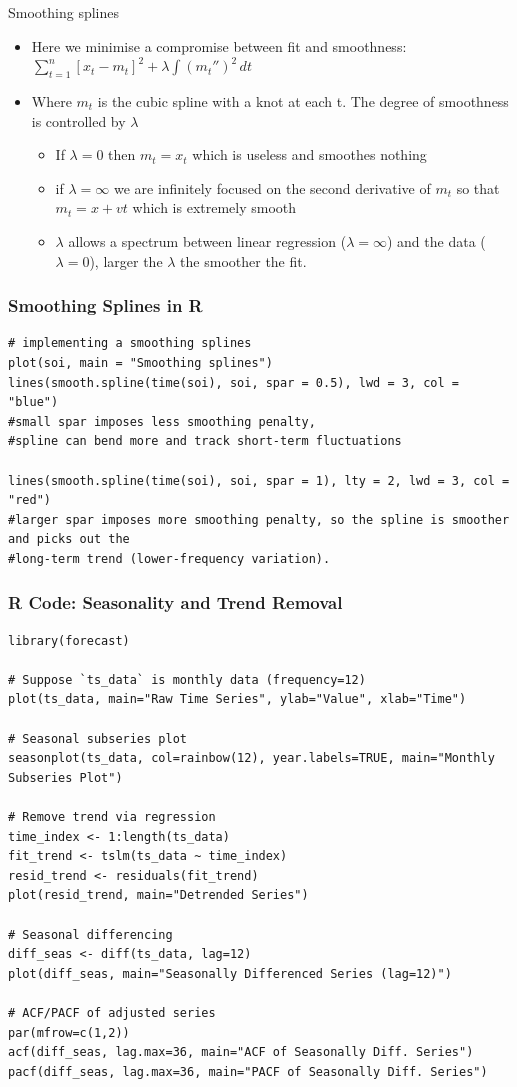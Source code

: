 \documentclass{article}
\begin{document}
\noindent Smoothing splines
\begin{itemize}
    \item Here we minimise a compromise between fit and smoothness: $\sum_{t=1}^n [x_t - m_t]^2 + \lambda \int (m_t '')^2 \, dt$
    \item Where $m_t$ is the cubic spline with a knot at each t. The degree of smoothness is controlled by $\lambda$
    \begin{itemize}
        \item If $\lambda = 0$ then $m_t = x_t$ which is useless and smoothes nothing
        \item if $\lambda= \infty$ we are infinitely focused  on the second derivative of $m_t$ so that $m_t = x + vt$ which is extremely smooth
        \item $\lambda$ allows a spectrum between linear regression ($\lambda = \infty$) and the data ($\lambda = 0$), larger the $\lambda$ the smoother the fit.
        \end{itemize}
\end{itemize}

\subsubsection{Smoothing Splines in R}
\begin{lstlisting}
# implementing a smoothing splines
plot(soi, main = "Smoothing splines")
lines(smooth.spline(time(soi), soi, spar = 0.5), lwd = 3, col = "blue") 
#small spar imposes less smoothing penalty,
#spline can bend more and track short-term fluctuations

lines(smooth.spline(time(soi), soi, spar = 1), lty = 2, lwd = 3, col = "red") 
#larger spar imposes more smoothing penalty, so the spline is smoother and picks out the 
#long-term trend (lower-frequency variation).
\end{lstlisting}


\subsubsection*{R Code: Seasonality and Trend Removal}
\begin{lstlisting}
library(forecast)

# Suppose `ts_data` is monthly data (frequency=12)
plot(ts_data, main="Raw Time Series", ylab="Value", xlab="Time")

# Seasonal subseries plot
seasonplot(ts_data, col=rainbow(12), year.labels=TRUE, main="Monthly Subseries Plot")

# Remove trend via regression
time_index <- 1:length(ts_data)
fit_trend <- tslm(ts_data ~ time_index)
resid_trend <- residuals(fit_trend)
plot(resid_trend, main="Detrended Series")

# Seasonal differencing
diff_seas <- diff(ts_data, lag=12)
plot(diff_seas, main="Seasonally Differenced Series (lag=12)")

# ACF/PACF of adjusted series
par(mfrow=c(1,2))
acf(diff_seas, lag.max=36, main="ACF of Seasonally Diff. Series")
pacf(diff_seas, lag.max=36, main="PACF of Seasonally Diff. Series")
\end{lstlisting}
\end{document}

